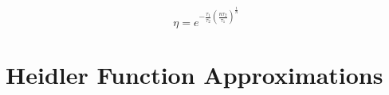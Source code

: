 

\begin{equation}
    \eta =e^{-\frac{\tau _1}{\tau _2} \left(\frac{n \tau _2}{\tau _1}\right)^{\frac{1}{n}}}
    \label{eqn:eta}
\end{equation}



\section{Heidler Function Approximations}
\label{sec:background_approximations}
